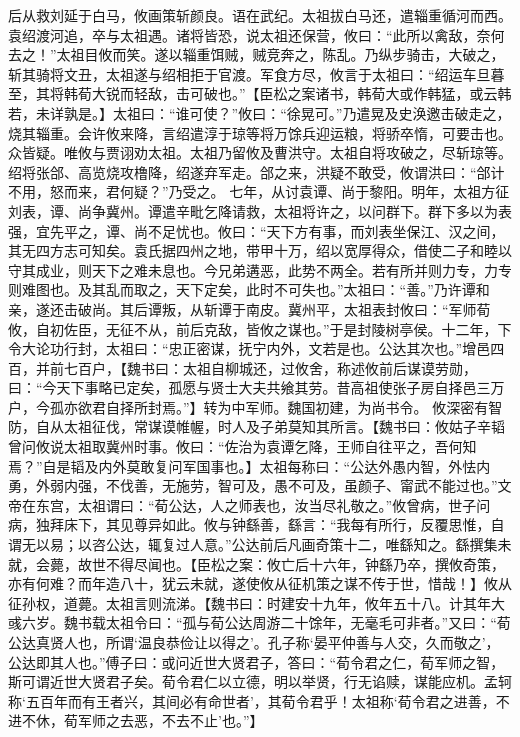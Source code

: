 \documentclass[12pt,UTF8]{ctexbook}
\begin{document}
后从救刘延于白马，攸画策斩颜良。语在武纪。太祖拔白马还，遣辎重循河而西。袁绍渡河追，卒与太祖遇。诸将皆恐，说太祖还保营，攸曰：“此所以禽敌，奈何去之！”太祖目攸而笑。遂以辎重饵贼，贼竞奔之，陈乱。乃纵步骑击，大破之，斩其骑将文丑，太祖遂与绍相拒于官渡。军食方尽，攸言于太祖曰：“绍运车旦暮至，其将韩{荀大}锐而轻敌，击可破也。”【臣松之案诸书，韩{荀大}或作韩猛，或云韩若，未详孰是。】太祖曰：“谁可使？”攸曰：“徐晃可。”乃遣晃及史涣邀击破走之，烧其辎重。会许攸来降，言绍遣淳于琼等将万馀兵迎运粮，将骄卒惰，可要击也。众皆疑。唯攸与贾诩劝太祖。太祖乃留攸及曹洪守。太祖自将攻破之，尽斩琼等。绍将张郃、高览烧攻橹降，绍遂弃军走。郃之来，洪疑不敢受，攸谓洪曰：“郃计不用，怒而来，君何疑？”乃受之。
七年，从讨袁谭、尚于黎阳。明年，太祖方征刘表，谭、尚争冀州。谭遣辛毗乞降请救，太祖将许之，以问群下。群下多以为表强，宜先平之，谭、尚不足忧也。攸曰：“天下方有事，而刘表坐保江、汉之间，其无四方志可知矣。袁氏据四州之地，带甲十万，绍以宽厚得众，借使二子和睦以守其成业，则天下之难未息也。今兄弟遘恶，此势不两全。若有所并则力专，力专则难图也。及其乱而取之，天下定矣，此时不可失也。”太祖曰：“善。”乃许谭和亲，遂还击破尚。其后谭叛，从斩谭于南皮。冀州平，太祖表封攸曰：“军师荀攸，自初佐臣，无征不从，前后克敌，皆攸之谋也。”于是封陵树亭侯。十二年，下令大论功行封，太祖曰：“忠正密谋，抚宁内外，文若是也。公达其次也。”增邑四百，并前七百户，【魏书曰：太祖自柳城还，过攸舍，称述攸前后谋谟劳勋，曰：“今天下事略已定矣，孤愿与贤士大夫共飨其劳。昔高祖使张子房自择邑三万户，今孤亦欲君自择所封焉。”】转为中军师。魏国初建，为尚书令。
攸深密有智防，自从太祖征伐，常谋谟帷幄，时人及子弟莫知其所言。【魏书曰：攸姑子辛韬曾问攸说太祖取冀州时事。攸曰：“佐治为袁谭乞降，王师自往平之，吾何知焉？”自是韬及内外莫敢复问军国事也。】太祖每称曰：“公达外愚内智，外怯内勇，外弱内强，不伐善，无施劳，智可及，愚不可及，虽颜子、甯武不能过也。”文帝在东宫，太祖谓曰：“荀公达，人之师表也，汝当尽礼敬之。”攸曾病，世子问病，独拜床下，其见尊异如此。攸与钟繇善，繇言：“我每有所行，反覆思惟，自谓无以易；以咨公达，辄复过人意。”公达前后凡画奇策十二，唯繇知之。繇撰集未就，会薨，故世不得尽闻也。【臣松之案：攸亡后十六年，钟繇乃卒，撰攸奇策，亦有何难？而年造八十，犹云未就，遂使攸从征机策之谋不传于世，惜哉！】攸从征孙权，道薨。太祖言则流涕。【魏书曰：时建安十九年，攸年五十八。计其年大彧六岁。魏书载太祖令曰：“孤与荀公达周游二十馀年，无毫毛可非者。”又曰：“荀公达真贤人也，所谓‘温良恭俭让以得之’。孔子称‘晏平仲善与人交，久而敬之’，公达即其人也。”傅子曰：或问近世大贤君子，答曰：“荀令君之仁，荀军师之智，斯可谓近世大贤君子矣。荀令君仁以立德，明以举贤，行无谄赎，谋能应机。孟轲称‘五百年而有王者兴，其间必有命世者’，其荀令君乎！太祖称‘荀令君之进善，不进不休，荀军师之去恶，不去不止’也。”】
\end{document}
